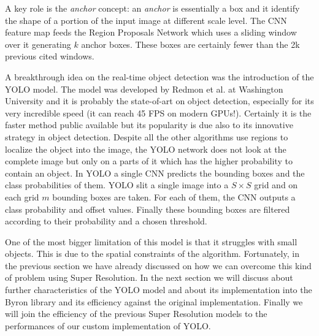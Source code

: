 \documentclass{standalone}
\begin{document}
A key role is the \emph{anchor} concept: an \emph{anchor} is essentially a box and it identify the shape of a portion of the input image at different scale level.
The CNN feature map feeds the Region Proposals Network which uses a sliding window over it generating $k$ anchor boxes.
These boxes are certainly fewer than the 2k previous cited windows.

A breakthrough idea on the real-time object detection was the introduction of the YOLO model.
The model was developed by Redmon et al. at Washington University and it is probably the state-of-art on object detection, especially for its very incredible speed (it can reach 45 FPS on modern GPUs!).
Certainly it is the faster method public available but its popularity is due also to its innovative strategy in object detection.
Despite all the other algorithms use regions to localize the object into the image, the YOLO network does not look at the complete image but only on a parts of it which has the higher probability to contain an object.
In YOLO a single CNN predicts the bounding boxes and the class probabilities of them.
YOLO slit a single image into a $S\times S$ grid and on each grid $m$ bounding boxes are taken.
For each of them, the CNN outputs a class probability and offset values.
Finally these bounding boxes are filtered according to their probability and a chosen threshold.

One of the most bigger limitation of this model is that it struggles with small objects.
This is due to the spatial constraints of the algorithm.
Fortunately, in the previous section we have already discussed on how we can overcome this kind of problem using Super Resolution.
In the next section we will discuss about further characteristics of the YOLO model and about its implementation into the Byron library and its efficiency against the original implementation.
Finally we will join the efficiency of the previous Super Resolution models to the performances of our custom implementation of YOLO.


\end{document}
